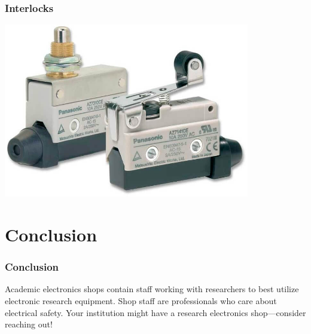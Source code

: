 \documentclass{presentation}
\begin{document}
\begin{frame}\frametitle{Interlocks}
  \centering
  \includegraphics[height=3in]{"./Limit-Switch.jpg"}
\end{frame}

\section{Conclusion}

\begin{frame}\frametitle{Conclusion}
  Academic electronics shops contain staff working with researchers to best utilize electronic research equipment.
  \vfill
  Shop staff are professionals who care about electrical safety.
  \vfill
  Your institution might have a research electronics shop---consider reaching out!
\end{frame}
\end{document}
